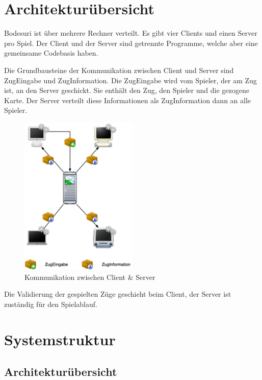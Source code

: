 \documentclass[a4paper,12pt,halfparskip,DIV14]{scrartcl}
\begin{document}


\section{Architekturübersicht} %
\label{sec:architekturübersicht}
Bodesuri ist über mehrere Rechner verteilt. Es gibt vier Clients und einen Server pro Spiel. Der Client und der Server sind getrennte Programme, welche aber eine gemeinsame Codebasis haben.

Die Grundbausteine der Kommunikation zwischen Client und Server sind ZugEingabe und ZugInformation. Die ZugEingabe wird vom Spieler, der am Zug ist, an den Server geschickt. Sie enthält den Zug, den Spieler und die gezogene Karte. Der Server verteilt diese Informationen als ZugInformation dann an alle Spieler.
\begin{figure}
	[htp] \centering 
	\includegraphics[width=0.50\textwidth]{clientServer.png} \caption{Kommunikation zwischen Client \& Server}\label{fig:legende.png} 
\end{figure}

Die Validierung der gespielten Züge geschieht beim Client, der Server ist zuständig für den Spielablauf.

\section{Systemstruktur} %
\label{Systemstruktur}

\subsection{Architekturübersicht} %
\label{sub:architekturuebersicht}
\end{document}
